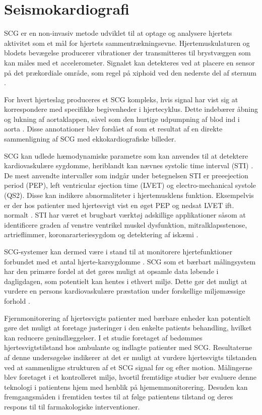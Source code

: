 \section{Seismokardiografi}

SCG er en non-invasiv metode udviklet til at optage og analysere hjertets aktivitet som et mål for hjertets sammentrækningsevne. Hjertemuskulaturen og blodets bevægelse producerer vibrationer der transmitteres til brystvæggen som kan måles med et accelerometer. \citep{inan2015} Signalet kan detekteres ved at placere en sensor på det prækordiale område, som regel på xiphoid ved den nederste del af sternum \citep{di2013wearable}. 

For hvert hjerteslag produceres et SCG kompleks, hvis signal har vist sig at korrespondere med specifikke begivenheder i hjertecyklus. Dette indebærer åbning og lukning af aortaklappen, såvel som den hurtige udpumpning af blod ind i aorta \citep{inan2015}. Disse annotationer blev forslået af \citet{crow1994relationship} som et resultat af en direkte sammenligning af SCG med ekkokardiografiske billeder. 

SCG kan udlede hæmodynamiske parametre som kan anvendes til at detektere kardiovaskulære sygdomme, heriblandt kan nævnes systolic time interval (STI) \citep{di2013wearable}. De mest anvendte intervaller som indgår under betegnelsen STI er preeejection period (PEP), left ventricular ejection time (LVET) og electro-mechanical systole (QS2). Disse kan indikere abnormaliteter i hjertemusklens funktion. \citep{Reant2010} Eksempelvis er der hos patienter med hjertesvigt vist en øget PEP og nedsat LVET ift. normalt \citep{Marcus2007}.  STI har været et brugbart værktøj adskillige applikationer såsom at identificere graden af venstre ventrikel muskel dysfunktion, mitralklapsstenose, artrieflimmer, koronararteriesygdom og detektering af iskæmi \citep{Shafiq2016}. 

SCG-systemer kan dermed være i stand til at monitorere hjertefunktioner forbundet med et antal hjerte-karsygdomme \citep{munir2008}. SCG som et bærbart målingsystem har den primære fordel at det gøres muligt at opsamle data løbende i dagligdagen, som potentielt kan hentes i ethvert miljø. Dette gør det muligt at vurdere en persons kardiovaskulære præstation under forskellige miljømæssige forhold \citep{inan2015}. 

Fjernmonitorering af hjertesvigts patienter med bærbare enheder kan potentielt gøre det muligt at foretage justeringer i den enkelte patients behandling, hvilket kan reducere genindlæggelser. I et studie foretaget af \cite{Inan2018} bedømmes hjertesvigtstilstand hos ambulante og indlagte patienter med SCG. Resultaterne af denne undersøgelse indikerer at det er muligt at vurdere hjertesvigts tilstanden ved at sammenligne strukturen af et SCG signal før og efter motion. Målingerne blev foretaget i et kontrolleret miljø, hvortil fremtidige studier bør evaluere denne teknologi i patientens hjem med henblik på hjememmonitorering. Desuden kan fremgangsmåden i fremtiden testes til at følge patientens tilstand og deres respons til til farmakologiske interventioner. \citep{Inan2018} 
 


